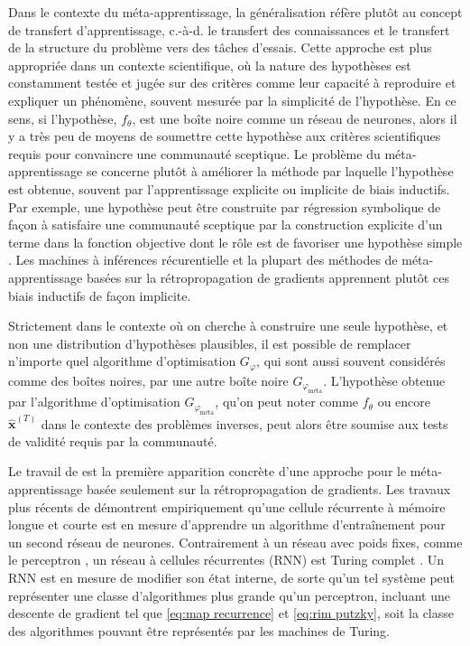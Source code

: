 Dans le contexte du méta-apprentissage, la généralisation réfère plutôt au concept de transfert d'apprentissage, c.-à-d. le transfert des connaissances 
et le transfert de la structure du problème vers des tâches d'essais. 
Cette approche est plus appropriée dans un contexte scientifique, où la nature des hypothèses est 
constamment testée et jugée sur des critères comme leur capacité à reproduire et expliquer un phénomène, souvent mesurée par 
la simplicité de l'hypothèse. En ce sens, 
si l'hypothèse, $f_\theta$, est une boîte noire comme un réseau de neurones, alors il y a très peu de moyens de soumettre 
cette hypothèse aux critères scientifiques requis pour convaincre une communauté sceptique. 
Le problème du méta-apprentissage se concerne plutôt à améliorer la méthode par laquelle l'hypothèse est obtenue, 
souvent par l'apprentissage explicite ou implicite de biais inductifs. 
Par exemple, une hypothèse peut être construite par régression symbolique 
de façon à satisfaire une communauté sceptique par la construction explicite 
d'un terme dans la fonction objective dont le rôle est de favoriser une hypothèse simple \citep[e.g.][]{Lemos2022}.
Les machines à inférences récurentielle et la plupart des méthodes de méta-apprentissage basées sur la 
rétropropagation de gradients \citep[e.g.][]{Finn2017} apprennent plutôt ces biais inductifs de façon implicite.

Strictement dans le contexte où on cherche à construire une seule hypothèse, et non une distribution d'hypothèses 
plausibles, il est possible de remplacer n'importe quel algorithme d'optimisation $G_\varphi$, qui sont aussi souvent considérés 
comme des boîtes noires, par une autre boîte noire $G_{\varphi_{\text{méta}}}$. L'hypothèse obtenue par 
l'algorithme d'optimisation $G_{\varphi_{\text{méta}}}$, qu'on peut noter comme $f_\theta$ ou encore $\hat{\mathbf{x}}^{(T)}$ 
dans le contexte des problèmes inverses, peut alors être soumise aux tests de validité
requis par la communauté. 

Le travail de \citet{Younger2001} est la première apparition concrète d'une approche pour le méta-apprentissage 
basée seulement sur la rétropropagation de gradients.
Les travaux plus récents de \citet{Andrychowicz2016} 
démontrent empiriquement qu'une cellule récurrente à mémoire longue et courte \citep[LSTM,][]{Hochreiter1997} est en mesure d'apprendre 
un algorithme d'entraînement pour un second réseau de neurones. %
Contrairement à un réseau avec poids fixes, comme le perceptron \citep{Rosenblatt1958}, 
un réseau à cellules récurrentes (RNN) est Turing complet \citep{Siegelmann1992}.
Un RNN est en mesure de modifier son état interne, de sorte qu'un tel système peut représenter une classe d'algorithmes plus grande qu'un perceptron, 
incluant une descente de gradient tel que \eqref{eq:map recurrence} et \eqref{eq:rim putzky}, 
soit la classe des algorithmes pouvant être représentés par les machines de Turing.


